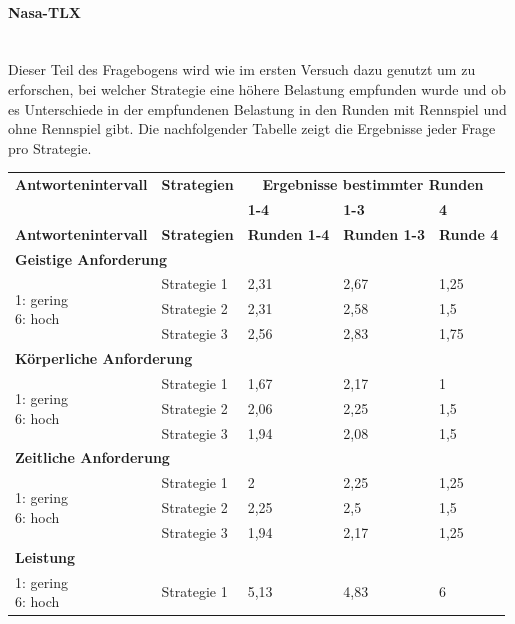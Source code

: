 \documentclass[12pt,a4paper]{scrartcl}
\begin{document}
\paragraph{Nasa-TLX}
~\\
Dieser Teil des Fragebogens wird wie im ersten Versuch dazu genutzt um zu erforschen, bei welcher Strategie eine höhere Belastung empfunden wurde und ob es Unterschiede in der empfundenen Belastung in den Runden mit Rennspiel und ohne Rennspiel gibt. 
Die nachfolgender Tabelle zeigt die Ergebnisse jeder Frage pro Strategie.
\begin{longtable}{|p{4cm}|p{2cm}|p{2cm}|p{2cm}|p{2cm}|}
	\hline
		\textbf{Antwortenintervall}&\textbf{Strategien}&\multicolumn{3}{c|}{\textbf{Ergebnisse bestimmter Runden}}\\
	&&\textbf{1-4}&\textbf{1-3} &\textbf{4}\\
	\hline
	\endfirsthead
	\hline
	\textbf{Antwortenintervall}&\textbf{Strategien}&\textbf{Runden 1-4}&\textbf{Runden 1-3} &\textbf{Runde 4}\\
	\hline
	\endhead
		\multicolumn{5}{l}{\textbf{Geistige Anforderung}}\\
		\hline
\multirow{3}{4cm}{1: gering \newline 6: hoch} & Strategie 1 &  2,31 & 2,67 & 1,25 \\
 & Strategie 2 & 2,31 & 2,58 & 1,5\\
 & Strategie 3 & 2,56 & 2,83 & 1,75 \\
\hline
		\multicolumn{5}{l}{\textbf{Körperliche Anforderung}}\\
		\hline
\multirow{3}{4cm}{1: gering \newline 6: hoch} & Strategie 1 & 1,67 & 2,17 & 1 \\
 & Strategie 2 & 2,06 & 2,25 & 1,5 \\
 & Strategie 3 & 1,94 & 2,08 & 1,5 \\
\hline
		\multicolumn{5}{l}{\textbf{Zeitliche Anforderung}}\\
		\hline
\multirow{3}{4cm}{1: gering \newline 6: hoch} & Strategie 1 & 2 & 2,25 & 1,25 \\
 & Strategie 2 & 2,25 & 2,5 & 1,5 \\
 & Strategie 3 & 1,94 & 2,17 & 1,25 \\
\hline
		\multicolumn{5}{l}{\textbf{Leistung}}\\
		\hline
\multirow{3}{4cm}{1: gering \newline 6: hoch} & Strategie 1 & 5,13 & 4,83 & 6 \\

\end{longtable}
\end{document}
